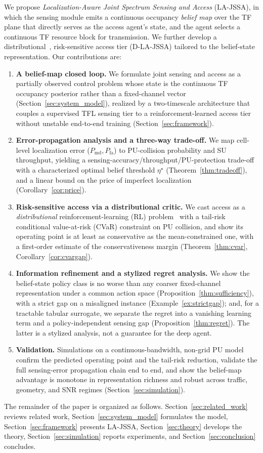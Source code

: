 \documentclass[journal]{IEEEtran}
\newcommand{\Pmd}{P_{\mathrm{md}}}         %
\newcommand{\Pfa}{P_{\mathrm{fa}}}         %
\newcommand{\thr}{\eta}                    %
\begin{document}
We propose \emph{Localization-Aware Joint Spectrum Sensing and Access}
(LA-JSSA), in which the sensing module emits a continuous occupancy
\emph{belief map} over the TF plane that directly serves as the access
agent's state, and the agent selects a continuous TF resource block for
transmission. We further develop a distributional~\cite{dabney2018qrdqn}, risk-sensitive access tier
(D-LA-JSSA) tailored to the belief-state representation. Our contributions
are:
\begin{enumerate}
\item \textbf{A belief-map closed loop.} We formulate joint sensing and
access as a partially observed control problem whose state is the continuous TF occupancy
posterior rather than a fixed-channel vector
(Section~\ref{sec:system_model}), realized by a two-timescale architecture
that couples a supervised TFL sensing tier to a reinforcement-learned access
tier without unstable end-to-end training (Section~\ref{sec:framework}).
\item \textbf{Error-propagation analysis and a three-way trade-off.} We map
cell-level localization error ($\Pmd,\Pfa$) to PU-collision probability and
SU throughput, yielding a sensing-accuracy/throughput/PU-protection
trade-off with a characterized optimal belief threshold $\thr^\star$
(Theorem~\ref{thm:tradeoff}), and a linear bound on the price of imperfect
localization (Corollary~\ref{cor:price}).
\item \textbf{Risk-sensitive access via a distributional critic.} We cast
access as a \emph{distributional} reinforcement-learning (RL)
problem~\cite{dabney2018qrdqn,ma2020dsac} with a tail-risk conditional
value-at-risk (CVaR) constraint on PU collision, and show its operating point is at least as
conservative as the mean-constrained one, with a first-order estimate of the
conservativeness margin (Theorem~\ref{thm:cvar},
Corollary~\ref{cor:cvargap}).
\item \textbf{Information refinement and a stylized regret analysis.} We show
the belief-state policy class is no worse than any coarser fixed-channel
representation under a common action space
(Proposition~\ref{thm:sufficiency}), with a strict gap on a misaligned
instance (Example~\ref{ex:strictgap}); and, for a tractable tabular
surrogate, we separate the regret into a vanishing learning term and a
policy-independent sensing gap (Proposition~\ref{thm:regret}). The latter is a
stylized analysis, not a guarantee for the deep agent.
\item \textbf{Validation.} Simulations on a continuous-bandwidth, non-grid
PU model confirm the predicted operating point and the tail-risk reduction,
validate the full sensing-error propagation chain end to end, and show the
belief-map advantage is monotone in representation richness and robust across
traffic, geometry, and SNR regimes (Section~\ref{sec:simulation}).
\end{enumerate}
The remainder of the paper is organized as follows.
Section~\ref{sec:related_work} reviews related work,
Section~\ref{sec:system_model} formulates the model,
Section~\ref{sec:framework} presents LA-JSSA,
Section~\ref{sec:theory} develops the theory,
Section~\ref{sec:simulation} reports experiments, and
Section~\ref{sec:conclusion} concludes.
\end{document}
